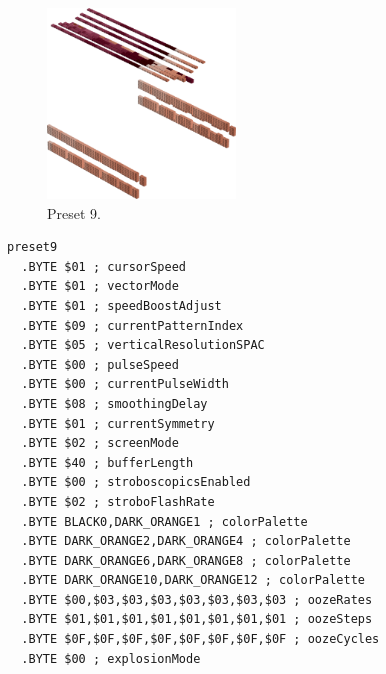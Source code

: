 \clearpage
\begin{minipage}[b]{0.48\linewidth}
\begin{figure}[H]                                                          
  \centering                                                             
  \begin{adjustbox}{width=5cm,center}                                   
  \includegraphics[width=5cm]{src/colorspace_presets/preset9-45.png}%
  \end{adjustbox}                                                        
\caption*{Preset 9.}                                           
\end{figure}                                                               
\end{minipage}
\hspace{0.1cm}
\begin{minipage}[b]{0.48\linewidth}                            
\begin{lstlisting}[basicstyle=\ttfamily\tiny]
preset9
  .BYTE $01 ; cursorSpeed
  .BYTE $01 ; vectorMode
  .BYTE $01 ; speedBoostAdjust
  .BYTE $09 ; currentPatternIndex
  .BYTE $05 ; verticalResolutionSPAC
  .BYTE $00 ; pulseSpeed
  .BYTE $00 ; currentPulseWidth
  .BYTE $08 ; smoothingDelay
  .BYTE $01 ; currentSymmetry
  .BYTE $02 ; screenMode
  .BYTE $40 ; bufferLength
  .BYTE $00 ; stroboscopicsEnabled
  .BYTE $02 ; stroboFlashRate
  .BYTE BLACK0,DARK_ORANGE1 ; colorPalette
  .BYTE DARK_ORANGE2,DARK_ORANGE4 ; colorPalette
  .BYTE DARK_ORANGE6,DARK_ORANGE8 ; colorPalette
  .BYTE DARK_ORANGE10,DARK_ORANGE12 ; colorPalette
  .BYTE $00,$03,$03,$03,$03,$03,$03,$03 ; oozeRates
  .BYTE $01,$01,$01,$01,$01,$01,$01,$01 ; oozeSteps
  .BYTE $0F,$0F,$0F,$0F,$0F,$0F,$0F,$0F ; oozeCycles
  .BYTE $00 ; explosionMode
\end{lstlisting}
\end{minipage}

\vspace*{-0.5cm}

